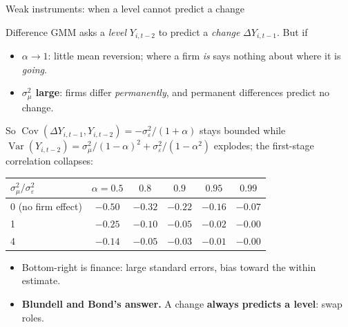\documentclass[
  11pt,
  ignorenonframetext,
  aspectratio=169,
]{beamer}
\providecommand{\tightlist}{%
  \setlength{\itemsep}{0pt}\setlength{\parskip}{0pt}}
\begin{document}
\begin{frame}{Weak instruments: when a level cannot predict a change}
\protect{}\label{weak-instruments-when-a-level-cannot-predict-a-change}
\setlength{\abovedisplayskip}{3pt}\setlength{\belowdisplayskip}{3pt}

Difference GMM asks a \emph{level} \(Y_{i,t-2}\) to predict a
\emph{change} \(\Delta Y_{i,t-1}\). But if

\begin{itemize}
\tightlist
\item
  \textbf{\(\alpha \to 1\)}: little mean reversion; where a firm
  \emph{is} says nothing about where it is \emph{going}.
\item
  \textbf{\(\sigma^2_\mu\) large}: firms differ \emph{permanently}, and
  permanent differences predict no change.
\end{itemize}

So
\(\operatorname{Cov}(\Delta Y_{i,t-1}, Y_{i,t-2}) = -\sigma^2_\varepsilon/(1+\alpha)\)
stays bounded while
\(\operatorname{Var}(Y_{i,t-2}) = \sigma^2_\mu/(1-\alpha)^2 + \sigma^2_\varepsilon/(1-\alpha^2)\)
explodes; the first-stage correlation collapses:

\begin{center}\footnotesize
\begin{tabular}{lccccc}
\toprule
$\sigma^2_\mu / \sigma^2_\varepsilon$ & $\alpha = 0.5$ & $0.8$ & $0.9$ & $0.95$ & $0.99$ \\
\midrule
0 (no firm effect) & $-0.50$ & $-0.32$ & $-0.22$ & $-0.16$ & $-0.07$ \\
1 & $-0.25$ & $-0.10$ & $-0.05$ & $-0.02$ & $-0.00$ \\
4 & $-0.14$ & $-0.05$ & $-0.03$ & $-0.01$ & $-0.00$ \\
\bottomrule
\end{tabular}
\end{center}

\begin{itemize}
\tightlist
\item
  Bottom-right is finance: large standard errors, bias toward the within
  estimate.
\item
  \textbf{Blundell and Bond's answer.} A change \textbf{always predicts
  a level}: swap roles.
\end{itemize}
\end{frame}
\end{document}
